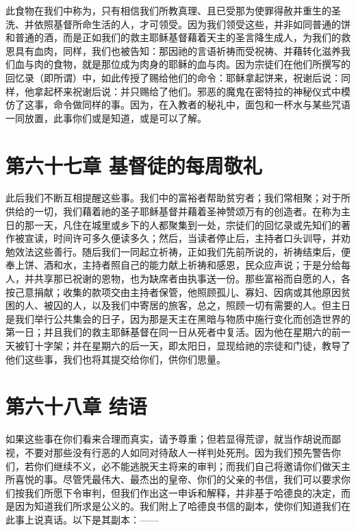 此食物在我们中称为，只有相信我们所教真理、且已受那为使罪得赦并重生的圣洗、并依照基督所命生活的人，才可领受。因为我们领受这些，并非如同普通的饼和普通的酒，而是正如我们的救主耶稣基督藉着天主的圣言降生成人，为我们的救恩具有血肉，同样，我们也被告知：那因祂的言语祈祷而受祝祷、并藉转化滋养我们血与肉的食物，就是那位成为肉身的耶稣的血与肉。因为宗徒们在他们所撰写的回忆录（即所谓）中，如此传授了赐给他们的命令：耶稣拿起饼来，祝谢后说：同样，他拿起杯来祝谢后说：并只赐给了他们。邪恶的魔鬼在密特拉的神秘仪式中模仿了这事，命令做同样的事。因为，在入教者的秘礼中，面包和一杯水与某些咒语一同放置，此事你们或是知道，或是可以了解。\par


\section{第六十七章 基督徒的每周敬礼}

此后我们不断互相提醒这些事。我们中的富裕者帮助贫穷者；我们常相聚；对于所供给的一切，我们藉着祂的圣子耶稣基督并藉着圣神赞颂万有的创造者。在称为主日的那一天，凡住在城里或乡下的人都聚集到一处，宗徒们的回忆录或先知们的著作被宣读，时间许可多久便读多久；然后，当读者停止后，主持者口头训导，并劝勉效法这些善行。随后我们一同起立祈祷，正如我们先前所说的，祈祷结束后，便奉上饼、酒和水，主持者照自己的能力献上祈祷和感恩，民众应声说；于是分给每人，并共享那已祝谢的恩物，也为缺席者由执事送一份。那些富裕而自愿的人，各按己意捐献；收集的款项交由主持者保管，他照顾孤儿、寡妇、因病或其他原因贫困的人、被囚的人，以及我们中寄居的旅客，总之，照顾一切有需要的人。但主日是我们举行公共集会的日子，因为那是天主在黑暗与物质中施行变化而创造世界的第一日；并且我们的救主耶稣基督在同一日从死者中复活。因为他在星期六的前一天被钉十字架；并在星期六的后一天，即太阳日，显现给祂的宗徒和门徒，教导了他们这些事，我们也将其提交给你们，供你们思量。\par


\section{第六十八章 结语}

如果这些事在你们看来合理而真实，请予尊重；但若显得荒谬，就当作胡说而鄙视，不要对那些没有行恶的人如同对待敌人一样判处死刑。因为我们预先警告你们，若你们继续不义，必不能逃脱天主将来的审判；而我们自己将邀请你们做天主所喜悦的事。尽管凭最伟大、最杰出的皇帝、你们的父亲的书信，我们可以要求你们按我们所愿下令审判，但我们作出这一申诉和解释，并非基于哈德良的决定，而是因为知道我们所求是公义的。我们附上了哈德良书信的副本，使你们知道我们在此事上说真话。以下是其副本：——\par

